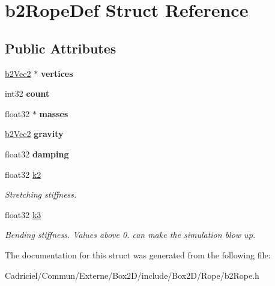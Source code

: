 \hypertarget{structb2_rope_def}{}\section{b2\+Rope\+Def Struct Reference}
\label{structb2_rope_def}
\subsection*{Public Attributes}
\begin{DoxyCompactItemize}
\item 
\hyperlink{structb2_vec2}{b2\+Vec2} $\ast$ {\bfseries vertices}\hypertarget{structb2_rope_def_ae18ad98b9796c505ae62ce58fa2f7051}{}\label{structb2_rope_def_ae18ad98b9796c505ae62ce58fa2f7051}

\item 
int32 {\bfseries count}\hypertarget{structb2_rope_def_a0c75d4289a807e31f32dc43a2276671f}{}\label{structb2_rope_def_a0c75d4289a807e31f32dc43a2276671f}

\item 
float32 $\ast$ {\bfseries masses}\hypertarget{structb2_rope_def_a78f75cce30ee253062ffa6f5462b36a1}{}\label{structb2_rope_def_a78f75cce30ee253062ffa6f5462b36a1}

\item 
\hyperlink{structb2_vec2}{b2\+Vec2} {\bfseries gravity}\hypertarget{structb2_rope_def_a90d98969150047662ce835ec1670fb32}{}\label{structb2_rope_def_a90d98969150047662ce835ec1670fb32}

\item 
float32 {\bfseries damping}\hypertarget{structb2_rope_def_a13ad872bb9d4926f3e4e49b7061613cb}{}\label{structb2_rope_def_a13ad872bb9d4926f3e4e49b7061613cb}

\item 
float32 \hyperlink{structb2_rope_def_a89de5d2c15afacd41722c76523e33826}{k2}\hypertarget{structb2_rope_def_a89de5d2c15afacd41722c76523e33826}{}\label{structb2_rope_def_a89de5d2c15afacd41722c76523e33826}

\begin{DoxyCompactList}\small\item\em Stretching stiffness. \end{DoxyCompactList}\item 
float32 \hyperlink{structb2_rope_def_a3f4749e0a309b53daf804c75adfb4ba8}{k3}\hypertarget{structb2_rope_def_a3f4749e0a309b53daf804c75adfb4ba8}{}\label{structb2_rope_def_a3f4749e0a309b53daf804c75adfb4ba8}

\begin{DoxyCompactList}\small\item\em Bending stiffness. Values above 0. can make the simulation blow up. \end{DoxyCompactList}\end{DoxyCompactItemize}


The documentation for this struct was generated from the following file\+:\begin{DoxyCompactItemize}
\item 
Cadriciel/\+Commun/\+Externe/\+Box2\+D/include/\+Box2\+D/\+Rope/b2\+Rope.\+h\end{DoxyCompactItemize}
